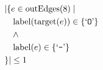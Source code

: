 \begin{align*}
&|\{e \in \mathrm{outEdges}(8)  \mid \\
&\quad \mathrm{label}(\mathrm{target}(e)) \in \{ \text{`\texttt{O}'} \}\\
&\quad \wedge\\
&\quad \mathrm{label}(e) \in \{ \text{`\texttt{-}'} \}\\
&\}| \leq 1
\end{align*}

